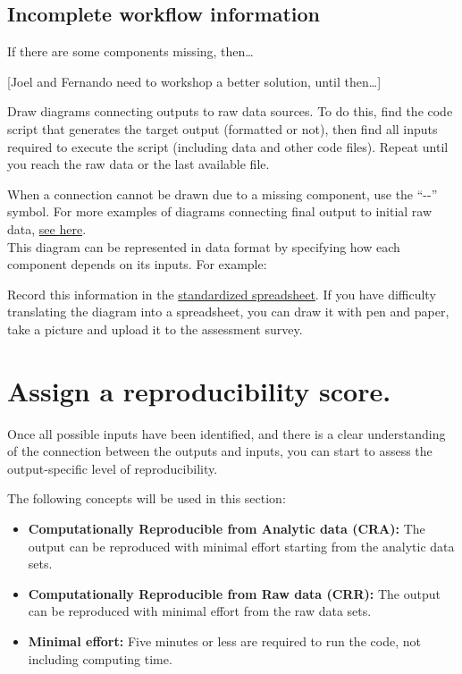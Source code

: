 \documentclass[]{book}
\begin{document}
\hypertarget{incomplete-workflow-information}{%
\subsection{Incomplete workflow information}\label{incomplete-workflow-information}}

If there are some components missing, then\ldots{}

{[}Joel and Fernando need to workshop a better solution, until then\ldots{}{]}

Draw diagrams connecting outputs to raw data sources. To do this, find the code script that generates the target output (formatted or not), then find all inputs required to execute the script (including data and other code files). Repeat until you reach the raw data or the last available file.

When a connection cannot be drawn due to a missing component, use the ``-\textbar{}\textbar{}-'' symbol. For more examples of diagrams connecting final output to initial raw data, \protect\hyperlink{additional-diagrams}{see here}.\\
This diagram can be represented in data format by specifying how each component depends on its inputs. For example:

Record this information in the \href{https://docs.google.com/spreadsheets/d/1LUIdVFH0OfR70C7z07TYeE-uWzKI_JIeWUMaYhqEKK0/edit\#gid=1384504774\&range=A1}{standardized spreadsheet}.
If you have difficulty translating the diagram into a spreadsheet, you can draw it with pen and paper, take a picture and upload it to the assessment survey.

\hypertarget{score}{%
\section{Assign a reproducibility score.}\label{score}}

Once all possible inputs have been identified, and there is a clear understanding of the connection between the outputs and inputs, you can start to assess the output-specific level of reproducibility.

The following concepts will be used in this section:

\begin{itemize}
\item
  \textbf{Computationally Reproducible from Analytic data (CRA):} The output can be reproduced with minimal effort starting from the analytic data sets.
\item
  \textbf{Computationally Reproducible from Raw data (CRR):} The output can be reproduced with minimal effort from the raw data sets.
\item
  \textbf{Minimal effort:} Five minutes or less are required to run the code, not including computing time.
\end{itemize}
\end{document}
